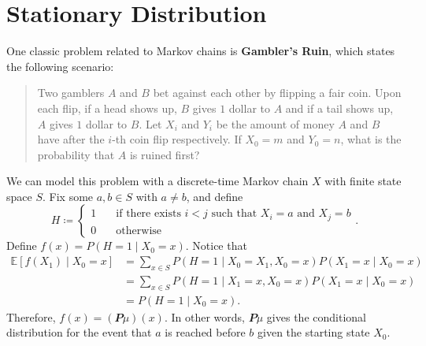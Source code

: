 \documentclass[math, code]{amznotes}
\theoremstyle{remark}
\begin{document}
\section{Stationary Distribution}
One classic problem related to Markov chains is \textbf{Gambler's Ruin}, which states the following scenario:
\begin{quote}
    Two gamblers $A$ and $B$ bet against each other by flipping a fair coin. Upon each flip, if a head shows up, $B$ gives $1$ dollar to $A$ and if a tail shows up, $A$ gives $1$ dollar to $B$. Let $X_i$ and $Y_i$ be the amount of money $A$ and $B$ have after the $i$-th coin flip respectively. If $X_0 = m$ and $Y_0 = n$, what is the probability that $A$ is ruined first? 
\end{quote}
We can model this problem with a discrete-time Markov chain $X$ with finite state space $S$. Fix some $a, b \in S$ with $a \neq b$, and define 
\begin{equation*}
    H \coloneqq \begin{cases}
        1 & \quad\textrm{if there exists } i < j \textrm{ such that } X_i = a \textrm{ and } X_j = b \\
        0 & \quad\textrm{otherwise}
    \end{cases}.
\end{equation*}
Define $f\left(x\right) = P\left(H = 1 \mid X_0 = x\right)$. Notice that 
\begin{align*}
    \mathbb{E}\left[f\left(X_1\right) \mid X_0 = x\right] & = \sum_{x \in S}P\left(H = 1 \mid X_0 = X_1, X_0 = x\right)P\left(X_1 = x \mid X_0 = x\right) \\
    & = \sum_{x \in S}P\left(H = 1 \mid X_1 = x, X_0 = x\right)P\left(X_1 = x \mid X_0 = x\right) \\
    & = P\left(H = 1 \mid X_0 = x\right).
\end{align*}
Therefore, $f\left(x\right) = \left(\mathbfit{P}\mu\right)\left(x\right)$. In other words, $\mathbfit{P}\mu$ gives the conditional distribution for the event that $a$ is reached before $b$ given the starting state $X_0$.
\end{document}

